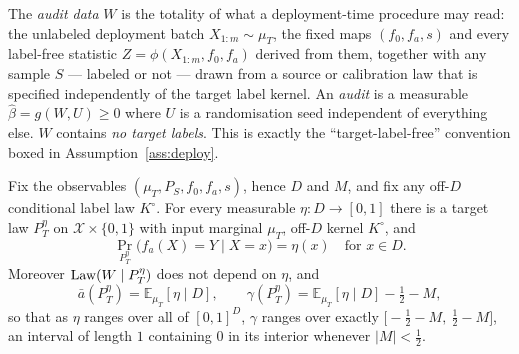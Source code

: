 %
%

\providecommand{\E}{\mathbb{E}}
\providecommand{\sign}{\operatorname{sign}}
\providecommand{\TV}{\mathrm{TV}}
\providecommand{\KL}{\mathrm{KL}}
\providecommand{\Var}{\operatorname{Var}}

\begin{definition}\label{def:audit-data}
The \emph{audit data} $W$ is the totality of what a deployment-time procedure may read:
the unlabeled deployment batch $X_{1:m}\sim\mu_T$, the fixed maps $(f_0,f_a,s)$ and every
label-free statistic $Z=\phi(X_{1:m},f_0,f_a)$ derived from them, together with any sample
$S$ --- labeled or not --- drawn from a source or calibration law that is specified
independently of the target label kernel. An \emph{audit} is a measurable
$\widehat\beta=g(W,U)\ge0$ where $U$ is a randomisation seed independent of everything else.
$W$ contains \emph{no target labels}. This is exactly the ``target-label-free'' convention
boxed in Assumption~\ref{ass:deploy}.
\end{definition}

\begin{lemma}\label{lem:fibre}
Fix the observables $(\mu_T,P_S,f_0,f_a,s)$, hence $D$ and $M$, and fix any off-$D$
conditional label law $K^\circ$. For every measurable $\eta:D\to[0,1]$ there is a target law
$P_T^{\eta}$ on $\mathcal X\times\{0,1\}$ with input marginal $\mu_T$, off-$D$ kernel
$K^\circ$, and
\[
\Pr_{P_T^{\eta}}\bigl(f_a(X)=Y\mid X=x\bigr)=\eta(x)\quad\text{for }x\in D .
\]
Moreover $\mathrm{Law}(W\mid P_T^{\eta})$ does not depend on $\eta$, and
\[
\bar a(P_T^\eta)=\E_{\mu_T}[\eta\mid D],\qquad
\gamma(P_T^\eta)=\E_{\mu_T}[\eta\mid D]-\tfrac12-M ,
\]
so that as $\eta$ ranges over all of $[0,1]^D$, $\gamma$ ranges over exactly
$\bigl[-\tfrac12-M,\ \tfrac12-M\bigr]$, an interval of length $1$ containing $0$ in its
interior whenever $|M|<\tfrac12$.
\end{lemma}

